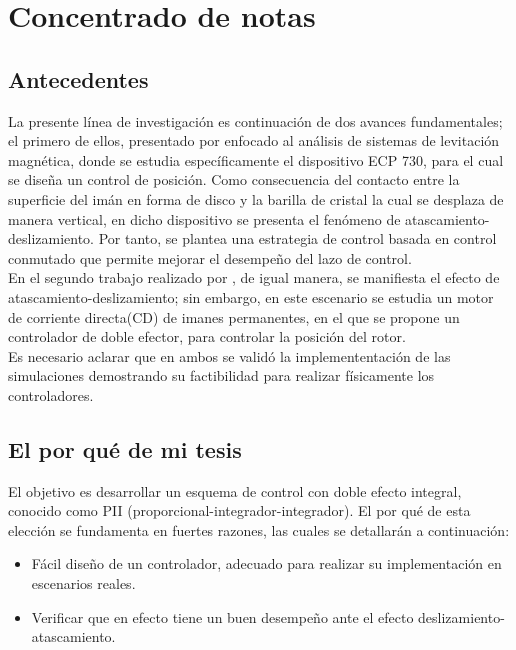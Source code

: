 \section{Concentrado de notas}

\subsection{Antecedentes}
La presente línea de investigación es continuación de dos avances fundamentales; el primero de ellos, presentado por \cite{alcantara} enfocado al análisis de sistemas de levitación magnética,
donde se estudia específicamente el dispositivo ECP 730, para el cual se diseña un control de posición.
Como consecuencia del contacto entre la superficie del imán en forma de disco y la barilla de cristal la cual se desplaza de manera vertical, en dicho dispositivo se presenta el fenómeno de atascamiento-deslizamiento.
Por tanto, se plantea una estrategia de control basada en control conmutado que permite mejorar el desempeño del lazo de control.\\
En el segundo trabajo realizado por \cite{perez}, de igual manera, se manifiesta el efecto de atascamiento-deslizamiento;
sin embargo, en este escenario se estudia un motor de corriente directa(CD) de imanes permanentes, en el que se propone un controlador de doble efector, para controlar la posición del rotor.\\
Es necesario aclarar que en ambos se validó la implemententación de las simulaciones demostrando su factibilidad para realizar físicamente los controladores. 

\subsection{El por qué de mi tesis}
El objetivo es desarrollar un esquema de control con doble efecto integral, conocido como PII (proporcional-integrador-integrador). El por qué de esta elección se fundamenta en fuertes razones, las cuales se detallarán a continuación:
\begin{itemize}
 \item Fácil diseño de un controlador, adecuado para realizar su implementación en escenarios reales.
 \item Verificar que en efecto tiene un buen desempeño ante el efecto deslizamiento-atascamiento.
\end{itemize}

